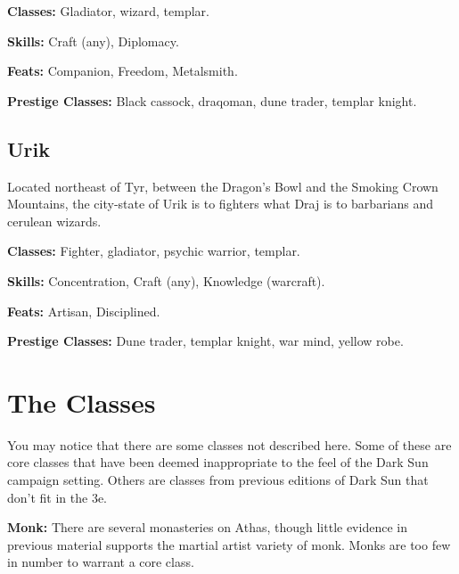 \documentclass[10pt,a4paper,twocolumn]{d20}
\begin{document}
{\textbf{Classes:} Gladiator, wizard, templar.

\textbf{Skills:} Craft (any), Diplomacy.

\textbf{Feats:} Companion, Freedom, Metalsmith.

\textbf{Prestige Classes:} Black cassock, draqoman, dune trader, templar knight.

\subsection{Urik}
Located northeast of Tyr, between the Dragon’s Bowl and the Smoking Crown Mountains, the city‐state of Urik is to fighters what Draj is to barbarians and cerulean wizards.

\textbf{Classes:} Fighter, gladiator, psychic warrior, templar.

\textbf{Skills:} Concentration, Craft (any), Knowledge (warcraft).

\textbf{Feats:} Artisan, Disciplined.

\textbf{Prestige Classes:} Dune trader, templar knight, war mind, yellow robe.


\section{The Classes}

You may notice that there are some classes not described here. Some of these are core classes that have been deemed inappropriate to the feel of the Dark Sun campaign setting. Others are classes from previous editions of Dark Sun that don’t fit in the 3e.

\textbf{Monk:} There are several monasteries on Athas, though little evidence in previous material supports the martial artist variety of monk. Monks are too few in number to warrant a core class.

}
\end{document}
